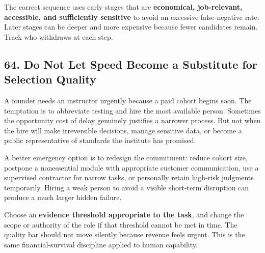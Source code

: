 The correct sequence uses early stages that are \textbf{economical, job-relevant, accessible, and sufficiently sensitive} to avoid an excessive false-negative rate. Later stages can be deeper and more expensive because fewer candidates remain. Track who withdraws at each step.

\subsection*{64. Do Not Let Speed Become a Substitute for Selection Quality}

A founder needs an instructor urgently because a paid cohort begins soon. The temptation is to abbreviate testing and hire the most available person. Sometimes the opportunity cost of delay genuinely justifies a narrower process. But not when the hire will make irreversible decisions, manage sensitive data, or become a public representative of standards the institute has promised.

A better emergency option is to redesign the commitment: reduce cohort size, postpone a nonessential module with appropriate customer communication, use a supervised contractor for narrow tasks, or personally retain high-risk judgments temporarily. Hiring a weak person to avoid a visible short-term disruption can produce a much larger hidden failure.

Choose an \textbf{evidence threshold appropriate to the task}, and change the scope or authority of the role if that threshold cannot be met in time. The quality bar should not move silently because revenue feels urgent. This is the same financial-survival discipline applied to human capability.
